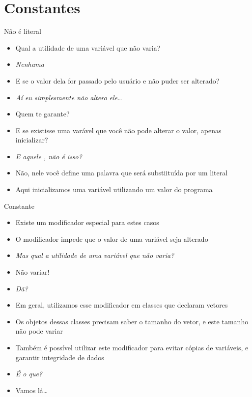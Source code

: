 \documentclass[14pt]{beamer}
\begin{document}
	\section{Constantes}
		\begin{frame}{Não é literal}
			\begin{itemize}
				\presentationPause\item Qual a utilidade de uma variável que não varia?
				\presentationPause\item \textit{Nenhuma}
				\presentationPause\item E se o valor dela for passado pelo usuário e não puder ser alterado?
				\presentationPause\item \textit{Aí eu simplesmente não altero ele\dots}
				\presentationPause\item Quem te garante?
				\presentationPause\item E se existisse uma varável que você não pode alterar o valor, apenas inicializar?
				\presentationPause\item \textit{E aquele , não é isso?}
				\presentationPause\item Não\presentationPause, nele você define uma palavra que será substiituída por um literal
				\presentationPause\item Aqui inicializamos uma variável utilizando um valor do programa
			\end{itemize}
		\end{frame}

		\begin{frame}{Constante}
			\begin{itemize}
				\presentationPause\item Existe um modificador especial para estes casos
				\presentationPause\item O modificador  impede que o valor de uma variável seja alterado
				\presentationPause\item \textit{Mas qual a utilidade de uma variável que não varia?}
				\presentationPause\item Não variar!
				\presentationPause\item \textit{Dã?}
				\presentationPause\item Em geral, utilizamos esse modificador em classes que declaram vetores
				\presentationPause\item Os objetos dessas classes precisam saber o tamanho do vetor, e este tamanho não pode variar
				\presentationPause\item Também é possível utilizar este modificador para evitar cópias de variáveis, e garantir integridade de dados
				\presentationPause\item \textit{É o que?}
				\presentationPause\item Vamos lá\dots
			\end{itemize}
		\end{frame}
\end{document}
